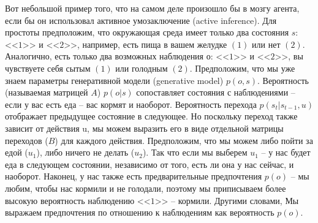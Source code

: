 \documentclass[twoside,leqno, 11pt]{article}
\begin{document}
	Вот небольшой пример того, что на самом деле произошло бы в мозгу агента, если бы он использовал активное умозаключение (active inference). Для простоты предположим, что окружающая среда имеет только два состояния $s$: <<$1$>> и <<$2$>>, например, есть пища в вашем желудке $(1)$ или нет $(2)$. Аналогично, есть только два возможных наблюдения $о$: <<$1$>> и <<$2$>>, вы чувствуете себя сытым $(1)$ или голодным $(2)$. Предположим, что мы уже знаем параметры генеративной модели (generative model) $p(o,s)$. Вероятность (называемая матрицей $A$) $p(o|s)$ сопоставляет состояния с наблюдениями -- если у вас есть еда -- вас кормят и наоборот. Вероятность перехода $p(s_t|s_{t-1},u)$ отображает предыдущее состояние в следующее. Но поскольку переход также зависит от действия u, мы можем выразить его в виде отдельной матрицы переходов ($B$) для каждого действия. Предположим, что мы можем либо пойти за едой ($u_1$), либо ничего не делать ($u_2$). Так что если мы выберем $u_1$ -- у нас будет еда в следующем состоянии, независимо от того, есть ли она у нас сейчас, и наоборот. Наконец, у нас также есть предварительные предпочтения $p(o)$ -- мы любим, чтобы нас кормили и не голодали, поэтому мы приписываем более высокую вероятность наблюдению <<$1$>> -- кормили. Другими словами, Мы выражаем предпочтения по отношению к наблюдениям как вероятность $p(o)$.
	
	\begin{figure}[h]
	\end{figure}
	
	
\end{document}
